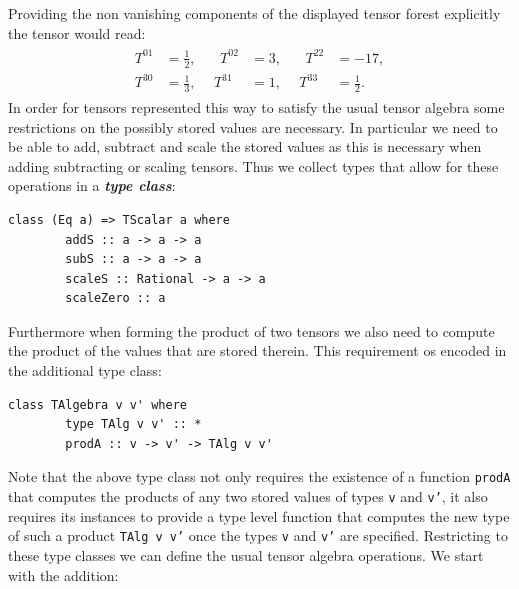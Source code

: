 \documentclass[a4paper,12pt, DIV=14, BCOR=5mm, twoside, headsepline]{scrbook}
\begin{document}
 Providing the non vanishing components of the displayed tensor forest explicitly the tensor would read:
\begin{align}
\begin{alignedat}{3}
T^{01} &= \frac{1}{2}, \ \  &  \ \ T^{02} &= 3, \ \  & \ \ T^{22} &= -17,\\
T^{30} &= \frac{1}{3}, & T^{31} &= 1, & T^{33} &= \frac{1}{2}.
\end{alignedat}
\end{align}
In order for tensors represented this way to satisfy the usual tensor algebra some restrictions on the possibly stored values are necessary. In particular we need to be able to add, subtract and scale the stored values as this is necessary when adding subtracting or scaling tensors. Thus we collect types that allow for these operations in a \textit{\textbf{type class}}:

\begin{samepage} 
\begin{verbatim}
class (Eq a) => TScalar a where 
        addS :: a -> a -> a 
        subS :: a -> a -> a
        scaleS :: Rational -> a -> a 
        scaleZero :: a
\end{verbatim} 
\end{samepage}

Furthermore when forming the product of two tensors we also need to compute the product of the values that are stored therein. This requirement os encoded in the additional type class:

\begin{samepage} 
\begin{verbatim}
class TAlgebra v v' where 
        type TAlg v v' :: * 
        prodA :: v -> v' -> TAlg v v'
\end{verbatim} 
\end{samepage}

Note that the above type class not only requires the existence of a function \texttt{prodA} that computes the products of any two stored values of types \texttt{v} and \texttt{v'}, it also requires its instances to provide a type level function that computes the new type of such a product \texttt{TAlg v v'} once the types \texttt{v} and \texttt{v'} are specified. Restricting to these type classes we can define the usual tensor algebra operations. We start with the addition:
\end{document}
